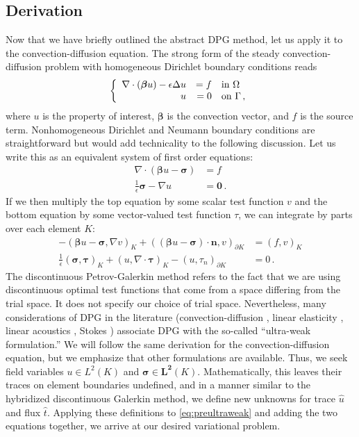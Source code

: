 \documentclass[letterpaper]{article}
\def\btau{\boldsymbol\tau}
\def\bsigma{\boldsymbol\sigma}
\def\bbeta{\boldsymbol\beta}
\newcommand{\bs}[1]{\boldsymbol{#1}}
\newcommand{\eqnref}[1]{\eqref{eq:#1}}
\newcommand{\mb}[1]{\mathbf{#1}}
\newcommand{\del}{\Delta}
\newcommand{\grad}{\nabla}
\renewcommand{\div}{\grad \cdot}
\begin{document}
\subsection{Derivation}
Now that we have briefly outlined the abstract DPG method, let us apply it to
the convection-diffusion equation. The strong form of the steady
convection-diffusion problem with homogeneous Dirichlet boundary conditions reads
\[
\left\{
\begin{array}[c]{rrl}
\div(\bs\beta u)-\epsilon\del u & =f & \text{in }\Omega\\
u & =0 & \text{on }\Gamma\,,
\end{array}
\right.
\]
where $u$ is the property of interest, $\bs\beta$ is the convection vector,
and $f$ is the source term. Nonhomogeneous Dirichlet and Neumann boundary
conditions are straightforward but would add technicality to the following
discussion. Let us write this as an equivalent system of first
order equations:
\begin{align*}
\div(\bs\beta u-\bs\sigma)&=f\\
\frac{1}{\epsilon}\bs\sigma-\grad u&=\bs0\,.
\end{align*}
If we then multiply the top equation by some scalar test function $v$ and the
bottom equation by some vector-valued test function $\tau$, we can integrate by
parts over each element $K$:
\begin{equation}
\label{eq:preultraweak}
\begin{aligned}
-(\bbeta u-\bsigma,\nabla v)_K+((\bbeta
u-\bsigma)\cdot\mathbf{n},v)_{\partial K}&=(f,v)_K\\
\frac{1}{\epsilon}(\bsigma,\btau)_K+(u,\nabla\cdot\btau)_K
-(u,\tau_n)_{\partial K}&=0\,.
\end{aligned}
\end{equation}
The discontinuous Petrov-Galerkin method refers to the fact that we are using
discontinuous optimal test functions that come from a space differing from the
trial space. It does not specify our choice of trial space. Nevertheless, many
considerations of DPG in the literature (convection-diffusion \cite{DPG6},
linear elasticity \cite{BramwellDemkowiczGopalakrishnanQiu11}, linear
acoustics \cite{DemkowiczGopalakrishnanMugaZitelli12}, Stokes
\cite{DPGStokes})
associate DPG with the so-called ``ultra-weak formulation.'' We will follow
the same derivation for the convection-diffusion equation, but we emphasize
that other formulations are available. Thus, we seek field variables $u\in
L^2(K)$ and $\bsigma\in\mb{L^2}(K)$. Mathematically, this leaves their traces
on element boundaries undefined, and in a manner similar to the hybridized
discontinuous Galerkin method, we define new unknowns for trace $\hat u$ and
flux $\hat t$.  Applying these definitions to \eqnref{preultraweak} and adding
the two equations together, we arrive at our desired variational problem. 
\end{document}
